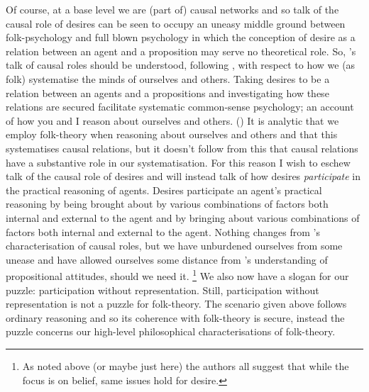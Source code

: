 \documentclass[10pt]{article}
\begin{document}
Of course, at a base level we are (part of) causal networks and so talk of the causal role of desires can be seen to occupy an uneasy middle ground between folk-psychology and full blown psychology in which the conception of desire as a relation between an agent and a proposition may serve no theoretical role.
So, \citeauthor{Perry:1997aa}'s talk of causal roles should be understood, following \textcite{Lewis:1979aa}, with respect to how we (as folk) systematise the minds of ourselves and others.
Taking desires to be a relation between an agents and a propositions and investigating how these relations are secured facilitate systematic common-sense psychology; an account of how you and I reason about ourselves and others.
(\citeyear[{\color{red} ???}]{Lewis:1999ab})
It is analytic that we employ folk-theory when reasoning about ourselves and others and that this systematises causal relations, but it doesn't follow from this that causal relations have a substantive role in our systematisation.
For this reason I wish to eschew talk of the causal role of desires and will instead talk of how desires \emph{participate} in the practical reasoning of agents.
Desires participate an agent's practical reasoning by being brought about by various combinations of factors both internal and external to the agent and by bringing about various combinations of factors both internal and external to the agent.
Nothing changes from \citeauthor{Perry:1997aa}'s characterisation of causal roles, but we have unburdened ourselves from some unease and have allowed ourselves some distance from \citeauthor{Perry:1997aa}'s understanding of propositional attitudes, should we need it.\nolinebreak
\footnote{\color{red} As noted above (or maybe just here) the authors all suggest that while the focus is on belief, same issues hold for desire.}
We also now have a slogan for our puzzle: participation without representation.
Still, participation without representation is not a puzzle for folk-theory.
The scenario given above follows ordinary reasoning and so its coherence with folk-theory is secure, instead the puzzle concerns our high-level philosophical characterisations of folk-theory.
\end{document}
